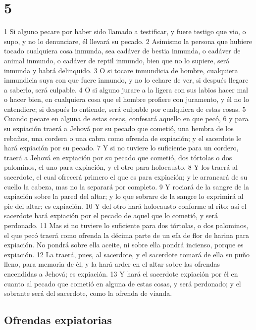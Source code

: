 \chapter{5}

1 Si alguno pecare por haber sido llamado a testificar, y fuere testigo que vio, o supo, y no lo denunciare, él llevará su pecado.
2 Asimismo la persona que hubiere tocado cualquiera cosa inmunda, sea cadáver de bestia inmunda, o cadáver de animal inmundo, o cadáver de reptil inmundo, bien que no lo supiere, será inmunda y habrá delinquido.
3 O si tocare inmundicia de hombre, cualquiera inmundicia suya con que fuere inmundo, y no lo echare de ver, si después llegare a saberlo, será culpable.
4 O si alguno jurare a la ligera con sus labios hacer mal o hacer bien, en cualquiera cosa que el hombre profiere con juramento, y él no lo entendiere; si después lo entiende, será culpable por cualquiera de estas cosas.
5 Cuando pecare en alguna de estas cosas, confesará aquello en que pecó,
6 y para su expiación traerá a Jehová por su pecado que cometió, una hembra de los rebaños, una cordera o una cabra como ofrenda de expiación; y el sacerdote le hará expiación por su pecado.
7 Y si no tuviere lo suficiente para un cordero, traerá a Jehová en expiación por su pecado que cometió, dos tórtolas o dos palominos, el uno para expiación, y el otro para holocausto.
8 Y los traerá al sacerdote, el cual ofrecerá primero el que es para expiación; y le arrancará de su cuello la cabeza, mas no la separará por completo.
9 Y rociará de la sangre de la expiación sobre la pared del altar; y lo que sobrare de la sangre lo exprimirá al pie del altar; es expiación.
10 Y del otro hará holocausto conforme al rito; así el sacerdote hará expiación por el pecado de aquel que lo cometió, y será perdonado.
11 Mas si no tuviere lo suficiente para dos tórtolas, o dos palominos, el que pecó traerá como ofrenda la décima parte de un efa   de flor de harina para expiación. No pondrá sobre ella aceite, ni sobre ella pondrá incienso, porque es expiación.
12 La traerá, pues, al sacerdote, y el sacerdote tomará de ella su puño lleno, para memoria de él, y la hará arder en el altar sobre las ofrendas encendidas a Jehová; es expiación.
13 Y hará el sacerdote expiación por él en cuanto al pecado que cometió en alguna de estas cosas, y será perdonado; y el sobrante será del sacerdote, como la ofrenda de vianda.

\section*{Ofrendas expiatorias}

